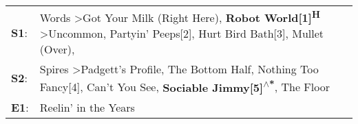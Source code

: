 \begin{supertabular}{p{0.03\textwidth}p{0.92\textwidth}}
 \textbf{S1}:  &  Words\textsuperscript{} \textgreater \enspace Got Your Milk (Right Here)\textsuperscript{}, \enspace \textbf{Robot World[1]\textsuperscript{H}} \textgreater \enspace Uncommon\textsuperscript{}, \enspace Partyin' Peeps[2]\textsuperscript{}, \enspace Hurt Bird Bath[3]\textsuperscript{}, \enspace Mullet (Over)\textsuperscript{}, \textsuperscript{}  \enspace  \\
 \textbf{S2}:  &                                          Spires\textsuperscript{} \textgreater \enspace Padgett's Profile\textsuperscript{}, \enspace The Bottom Half\textsuperscript{}, \enspace Nothing Too Fancy[4]\textsuperscript{}, \enspace Can't You See\textsuperscript{}, \enspace \textbf{Sociable Jimmy[5]\textsuperscript{$\wedge$*}}, \enspace The Floor\textsuperscript{}  \enspace  \\
 \textbf{E1}:  &                                                                                                                                                                                                                                                                                                                                   Reelin' in the Years\textsuperscript{}  \enspace  \\
\end{supertabular}
